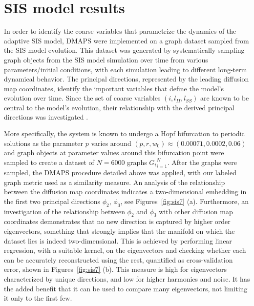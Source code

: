 \section{SIS model results}

In order to identify the coarse variables that parametrize the
dynamics of the adaptive SIS model, DMAPS were implemented on a graph
dataset sampled from the SIS model evolution. This dataset was
generated by systematically sampling graph objects from the SIS model
simulation over time from various parameters/initial conditions, with
each simulation leading to different long-term dynamical behavior. The
principal directions, represented by the leading diffusion map
coordinates, identify the important variables that define the model's
evolution over time. Since the set of coarse variables
$(i, l_{II}, l_{SS})$ are known to be central to the model's
evolution, their relationship with the derived principal directions
was investigated \cite{gross_robust_2008}.

More specifically, the system is known to undergo a Hopf bifurcation
to periodic solutions as the parameter $p$ varies around
$(p, r, w_0) \approx (0.00071, 0.0002, 0.06)$ and graph objects at
parameter values around this bifurcation point were sampled to create
a dataset of $N = 6000$ graphs ${G_i}_{i=1}^N$. After the graphs were
sampled, the DMAPS procedure detailed above was applied, with our
labeled graph metric used as a similarity measure. An analysis of the
relationship between the diffusion map coordinates indicates a
two-dimensional embedding in the first two principal directions
$\phi_2$, $\phi_3$, see Figures~\ref{fig:sis7} (a). Furthermore, an
investigation of the relationship between $\phi_2$ and $\phi_3$ with
other diffusion map coordinates demonstrates that no new direction is
captured by higher order eigenvectors, something that strongly implies
that the manifold on which the dataset lies is indeed
two-dimensional. This is achieved by performing linear regression,
with a suitable kernel, on the eigenvectors and checking whether each
can be accurately reconstructed using the rest, quantified as
cross-validation error, shown in Figures~\ref{fig:sis7} (b). This
measure is high for eigenvectors characterized by unique directions,
and low for higher harmonics and noise. It has the added benefit that
it can be used to compare many eigenvectors, not limiting it only to
the first few.

